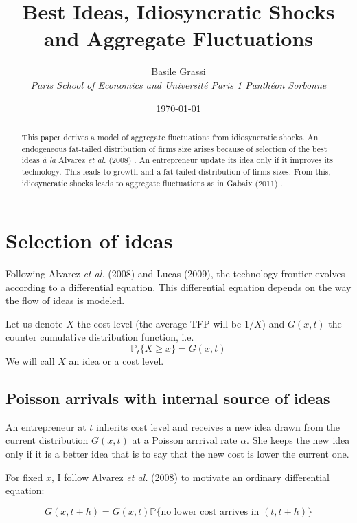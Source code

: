 \documentclass[12pt]{article}
\title{Best Ideas, Idiosyncratic Shocks and Aggregate Fluctuations}
\author{Basile Grassi\\
\small{\emph{Paris School of Economics and Université Paris 1 Panthéon Sorbonne}}
}
\date{\today}
\begin{document}
\maketitle

\begin{abstract}
This paper derives a model of aggregate fluctuations from idiosyncratic shocks. An endogeneous fat-tailed distribution of firms size arises because of selection of the best ideas \emph{\`a la} Alvarez \emph{et al.} (2008) \nocite{Alva08}. An entrepreneur update its idea only if it improves its technology. This leads to growth and a fat-tailed distribution of firms sizes. From this, idiosyncratic shocks leads to aggregate fluctuations as in Gabaix (2011) \nocite{Gaba11}.
\end{abstract}



\section{Selection of ideas}

Following Alvarez \emph{et al.} (2008) \nocite{Alva08} and Lucas (2009)\nocite{Luca09}, the technology frontier evolves according to a differential equation. This differential equation depends on the way the flow of ideas is modeled.

Let us denote $X$ the cost level (the average TFP will be $1/X$) and $G(x,t)$ the counter cumulative distribution function, i.e.
\begin{equation*}
\mathbb{P}_t\{X \geq x\} = G(x,t)
\end{equation*}
We will call $X$ an idea or a cost level.

\subsection{Poisson arrivals with internal source of ideas}
An entrepreneur at $t$  inherits cost level and receives a new idea drawn from the current distribution $G(x,t)$ at a Poisson arrrival rate $\alpha$. She keeps the new idea only if it is a better idea that is to say that the new cost is lower the current one.

For fixed $x$, I follow Alvarez \emph{et al.} (2008) \nocite{Alva08} to motivate  an ordinary differential equation:

\begin{equation*}
G(x,t+h)=G(x,t)  \mathbb{P} \{ \text{no lower cost arrives in } (t,t+h) \} 
\end{equation*}
\end{document}
